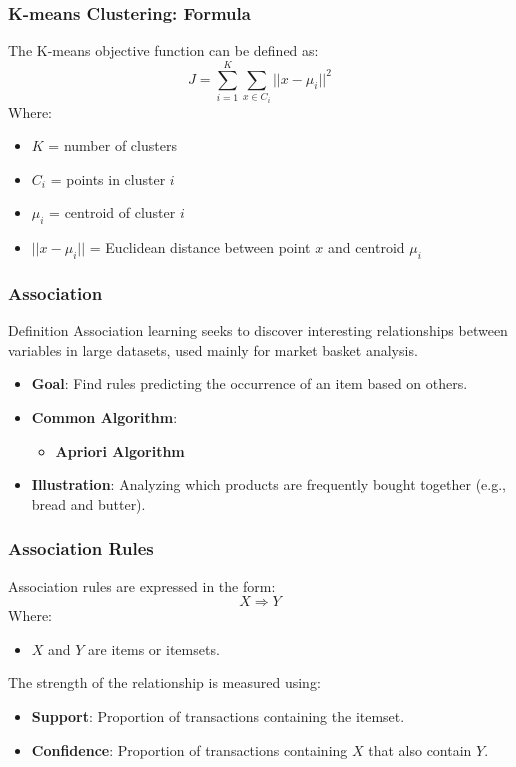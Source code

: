 \documentclass[aspectratio=169]{beamer}
\begin{document}
\begin{frame}[fragile]
    \frametitle{K-means Clustering: Formula}
    
    The K-means objective function can be defined as:
    \begin{equation}
        J = \sum_{i=1}^{K} \sum_{x \in C_i} ||x - \mu_i||^2
    \end{equation}
    Where:
    \begin{itemize}
        \item \( K \) = number of clusters
        \item \( C_i \) = points in cluster \( i \)
        \item \( \mu_i \) = centroid of cluster \( i \)
        \item \( ||x - \mu_i|| \) = Euclidean distance between point \( x \) and centroid \( \mu_i \)
    \end{itemize}
\end{frame}

\begin{frame}[fragile]
    \frametitle{Association}
    
    \begin{block}{Definition}
        Association learning seeks to discover interesting relationships between variables in large datasets, used mainly for market basket analysis.
    \end{block}
    
    \begin{itemize}
        \item \textbf{Goal}: Find rules predicting the occurrence of an item based on others.
        \item \textbf{Common Algorithm}:
        \begin{itemize}
            \item \textbf{Apriori Algorithm}
        \end{itemize}
        \item \textbf{Illustration}: Analyzing which products are frequently bought together (e.g., bread and butter).
    \end{itemize}
\end{frame}

\begin{frame}[fragile]
    \frametitle{Association Rules}
    
    Association rules are expressed in the form:
    \[
        X \Rightarrow Y
    \]
    Where:
    \begin{itemize}
        \item \( X \) and \( Y \) are items or itemsets.
    \end{itemize}
    
    The strength of the relationship is measured using:
    \begin{itemize}
        \item \textbf{Support}: Proportion of transactions containing the itemset.
        \item \textbf{Confidence}: Proportion of transactions containing \( X \) that also contain \( Y \).
    \end{itemize}
\end{frame}
\end{document}
